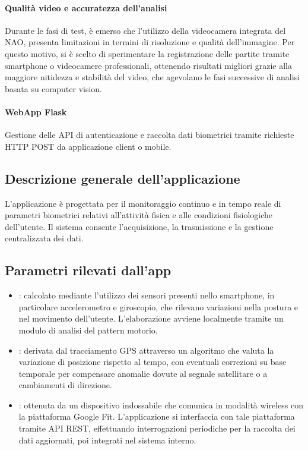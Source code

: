 \documentclass{optica-article}
\begin{document}
\paragraph{Qualità video e accuratezza dell’analisi}
Durante le fasi di test, è emerso che l’utilizzo della videocamera integrata del NAO, presenta limitazioni in termini di risoluzione e qualità dell’immagine. Per questo motivo, si è scelto di sperimentare la registrazione delle partite tramite smartphone o videocamere professionali, ottenendo risultati  migliori grazie alla maggiore nitidezza e stabilità del video, che agevolano le fasi successive di analisi basata su computer vision.
\FloatBarrier

\paragraph{WebApp Flask}
Gestione delle API di autenticazione e raccolta dati biometrici tramite richieste HTTP POST da applicazione client o mobile.

\subsection{Descrizione generale dell'applicazione}
L'applicazione \`e progettata per il monitoraggio continuo e in tempo reale di parametri biometrici relativi all'attivit\`a fisica e alle condizioni fisiologiche dell'utente. Il sistema consente l'acquisizione, la trasmissione e la gestione centralizzata dei dati.

\subsection{Parametri rilevati dall'app}
\begin{itemize}
    \item {}: calcolato mediante l'utilizzo dei sensori presenti nello smartphone, in particolare accelerometro e giroscopio, che rilevano variazioni nella postura e nel movimento dell'utente. L'elaborazione avviene localmente tramite un modulo di analisi del pattern motorio.
    \item {}: derivata dal tracciamento GPS attraverso un algoritmo che valuta la variazione di posizione rispetto al tempo, con eventuali correzioni su base temporale per compensare anomalie dovute al segnale satellitare o a cambiamenti di direzione.
    \item {}: ottenuta da un dispositivo indossabile che comunica in modalit\`a wireless con la piattaforma Google Fit. L'applicazione si interfaccia con tale piattaforma tramite API REST, effettuando interrogazioni periodiche per la raccolta dei dati aggiornati, poi integrati nel sistema interno.
\end{itemize}
\end{document}
